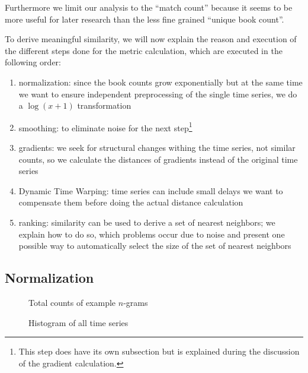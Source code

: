 Furthermore we limit our analysis to the \enquote{match count} because it seems to be more useful for later research than the less fine grained \enquote{unique book count}.

To derive meaningful similarity, we will now explain the reason and execution of the different steps done for the metric calculation, which are executed in the following order:

\begin{enumerate}
    \item normalization: since the book counts grow exponentially but at the same time we want to ensure independent preprocessing of the single time series, we do a $\log(x + 1)$ transformation
    \item smoothing: to eliminate noise for the next step\footnote{This step does have its own subsection but is explained during the discussion of the gradient calculation.}
    \item gradients: we seek for structural changes withing the time series, not similar counts, so we calculate the distances of gradients instead of the original time series
    \item Dynamic Time Warping: time series can include small delays we want to compensate them before doing the actual distance calculation
    \item ranking: similarity can be used to derive a set of nearest neighbors; we explain how to do so, which problems occur due to noise and present one possible way to automatically select the size of the set of nearest neighbors
\end{enumerate}


\subsection{Normalization}
\label{ssec:baseline:sim:norm}

\begin{figure}
    \centering
    
    \caption{Total counts of example $n$-grams}\label{fig:ngrams_ex_total}
\end{figure}

\begin{figure}
    \centering
    
    \caption{Histogram of all time series}\label{fig:ngrams_hist}
\end{figure}

